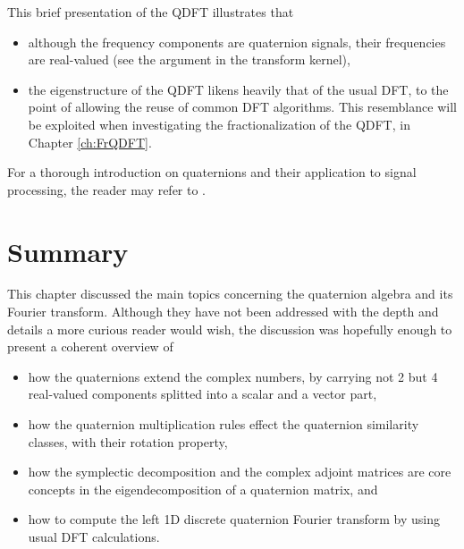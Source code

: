 This brief presentation of the QDFT illustrates that
\begin{itemize}[noitemsep]
    \item although the frequency components are quaternion signals, their frequencies are real-valued (see the argument in the transform kernel),
    \item the eigenstructure of the QDFT likens heavily that of the usual DFT, to the point of allowing the reuse of common DFT algorithms. This resemblance will be exploited when investigating the fractionalization of the QDFT, in Chapter \ref{ch:FrQDFT}.
\end{itemize}

For a thorough introduction on quaternions and their application to signal processing, the reader may refer to \cite{grigoryan2018quaternion,zhang1997quaternions,ell2014quaternion,flamant2017time, jiang2014general}.

\section{Summary}

This chapter discussed the main topics concerning the quaternion algebra and its Fourier transform. Although they have not been addressed with the depth and details a more curious reader would wish, the discussion was hopefully enough to present a coherent overview of
\begin{itemize}[noitemsep]
    \item how the quaternions extend the complex numbers, by carrying not 2 but 4 real-valued components splitted into a scalar and a vector part,
    \item how the quaternion multiplication rules effect the quaternion similarity classes, with their rotation property,
    \item how the symplectic decomposition and the complex adjoint matrices are core concepts in the eigendecomposition of a quaternion matrix, and
    \item how to compute the left 1D discrete quaternion Fourier transform by using usual DFT calculations.
\end{itemize}